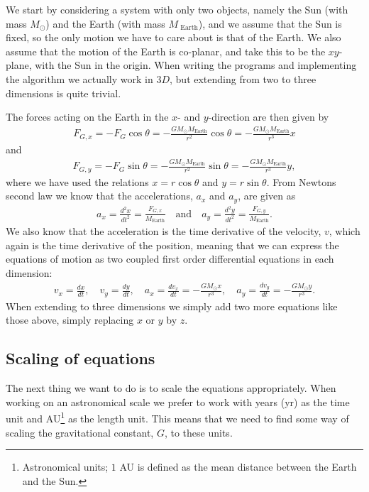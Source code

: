 \documentclass[12pt, a4paper]{article}
\begin{document}
We start by considering a system with only two objects, namely the Sun (with mass $M_{\odot}$) and the 
Earth (with mass $M_{\text{ Earth}}$), and we assume that the Sun is fixed, so the only motion we have to
care about is that of the Earth. We also assume that the motion of the Earth is co-planar, and take this 
to be the $xy$-plane, with the Sun in the origin. When writing the programs and implementing the 
algorithm we actually work in $3D$, but extending from two to three dimensions is quite trivial.  

The forces acting on the Earth in the $x$- and $y$-direction are then given by 
\begin{align*}
F_{G,x} = - F_G \cos\theta  = - \frac{GM_{\odot} M_{\text{Earth}}}{r^2}\cos\theta 
							= - \frac{GM_{\odot} M_{\text{Earth}}}{r^3}x 
\end{align*} 
and 
\begin{align*}
F_{G,y} = - F_G \sin\theta  = - \frac{GM_{\odot} M_{\text{Earth}}}{r^2}\sin\theta 
							= - \frac{GM_{\odot} M_{\text{Earth}}}{r^3}y,  
\end{align*}
where we have used the relations $x = r\cos\theta$ and $y = r\sin\theta$. From Newtons second law we know 
that the accelerations, $a_x$ and $a_y$, are given as 
\begin{align*}
a_x = \frac{d^2x}{dt^2} = \frac{F_{G,x}}{M_{\text{Earth}}} \quad \text{and} \quad 
a_y = \frac{d^2y}{dt^2} = \frac{F_{G,y}}{M_{\text{Earth}}}. 
\end{align*} 
We also know that the acceleration is the time derivative of the velocity, $v$, which again is 
the time derivative of the position, meaning that we can express the equations of motion as two 
coupled first order differential equations in each dimension:  
\begin{align}
v_x = \frac{dx}{dt}, \quad v_y = \frac{dy}{dt}, \quad 
a_x = \frac{dv_x}{dt} = -\frac{GM_{\odot}x}{r^3}, \quad a_y = \frac{dv_y}{dt} = -\frac{GM_{\odot}y}{r^3}.   
\label{eq:diff_eqs}
\end{align}
When extending to three dimensions we simply add two more equations like those above, simply 
replacing $x$ or $y$ by $z$. 

\subsection*{Scaling of equations}

The next thing we want to do is to scale the equations appropriately. When working on an astronomical 
scale we prefer to work with years (yr) as the time unit and AU\footnote{Astronomical units; $1$ AU is
defined as the mean distance between the Earth and the Sun.} as the length unit. This means that we 
need to find some way of scaling the gravitational constant, $G$, to these units. 
\end{document}
